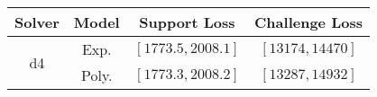 \begin{tabular}{cc|c|c} 
\hline 
 Solver & Model & Support Loss  & Challenge Loss \tabularnewline\hline 
\hline 
\multirow{2}{*}{d4} & Exp. & $\left[1773.5,2008.1\right]$ & $\left[13174,14470\right]$ \tabularnewline 
 & Poly. & $\left[1773.3,2008.2\right]$ & $\left[13287,14932\right]$ \tabularnewline 
\hline 
\end{tabular} 

